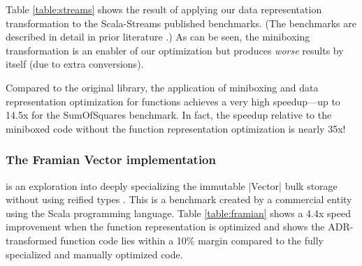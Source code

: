 Table \ref{table:streams} shows the result of applying our data
representation transformation to the Scala-Streams published
benchmarks. (The benchmarks are described in detail in prior
literature \cite{biboudis_clash_2014}.) As can be seen, the miniboxing
transformation is an enabler of our optimization but produces
\emph{worse} results by itself (due to extra conversions).

Compared to the original library, the application of miniboxing and
data representation optimization for functions achieves a very high
speedup---up to 14.5x for the SumOfSquares benchmark. In fact, the
speedup relative to the miniboxed code without the function
representation optimization is nearly 35x!



\subsubsection{The Framian Vector implementation} is an exploration into deeply specializing the immutable |Vector| bulk storage without using reified types \cite{tixxit-respecialization15,tixxit-respecialization6}. This is a benchmark created by a commercial entity using the Scala programming language. Table \ref{table:framian} shows a 4.4x speed improvement when the function representation is optimized and shows the ADR-transformed function code lies within a 10\% margin compared to the fully specialized and manually optimized code.

